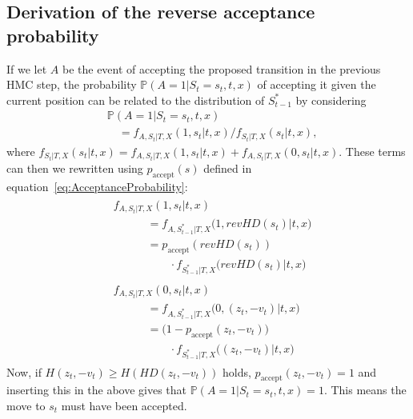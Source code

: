 \begin{appendices}

\section{Derivation of the reverse acceptance probability}
\label{app:DerivationOfReverseAcceptanceProbability}
If we let $A$ be the event of accepting the proposed transition in the previous HMC step, the probability $\mathbb{P}(A = 1|S_t = s_t, t, x)$ of accepting it given the current position can be related to the distribution of $S_{t-1}^*$ by considering
\begin{equation}
\begin{split}
&\mathbb{P}(A = 1|S_t = s_t, t, x) \\
&\quad= f_{A, S_t|T, X}(1, s_t| t, x)/f_{S_t|T, X}(s_t| t, x),
\end{split}
\end{equation}
where $f_{S_t|T, X}(s_t| t, x) = f_{A, S_t|T, X}(1, s_t| t, x) + f_{A, S_t|T, X}(0, s_t| t, x)$. These terms can then we rewritten using $p_\textrm{accept}(s)$ defined in equation~\eqref{eq:AcceptanceProbability}:
\begin{align}
\begin{split}
&f_{A, S_t|T, X}(1, s_t| t, x) \\
&\quad\qquad = f_{A, S_{t-1}^*|T, X}\big(1, revHD(s_t)| t, x\big) \\
&\quad\qquad = p_\textrm{accept}(revHD(s_t)) \\
&\quad\qquad\qquad \cdot f_{S^*_{t-1}|T, X}\big(revHD(s_t)| t, x\big)
\end{split} \\
\begin{split}
&f_{A, S_t|T, X}(0, s_t| t, x) \\
&\quad\qquad = f_{A, S_{t-1}^*|T, X}\big(0, (z_t, -v_t)| t, x\big) \\
&\quad\qquad = \big(1 - p_\textrm{accept}(z_t, -v_t)\big) \\
&\quad\qquad\qquad \cdot f_{S^*_{t-1}|T, X}\big((z_t, -v_t)| t, x\big)
\end{split}
\end{align}
Now, if $H(z_t, -v_t) \geq H(HD(z_t, -v_t))$ holds, $p_\textrm{accept}(z_t, -v_t) = 1$ and inserting this in the above gives that $\mathbb{P}(A = 1|S_t = s_t, t, x) = 1$. This means the move to $s_t$ must have been accepted.


\end{appendices}
